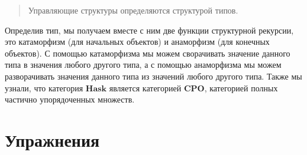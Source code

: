 \begin{quote}
Управляющие структуры определяются структурой типов.
\end{quote}

Определив тип, мы получаем вместе с ним две функции
структурной рекурсии, это катаморфизм (для начальных объектов) 
и анаморфизм (для конечных объектов). С помощью катаморфизма
мы можем сворачивать значение данного типа в значения
любого другого типа, а с помощью анаморфизма
мы можем разворачивать значения данного типа из
значений любого другого типа. Также мы узнали, что 
категория $\textbf{Hask}$
является категорией $\textbf{CPO}$, категорией полных
частично упорядоченных множеств.

\section{Упражнения}

